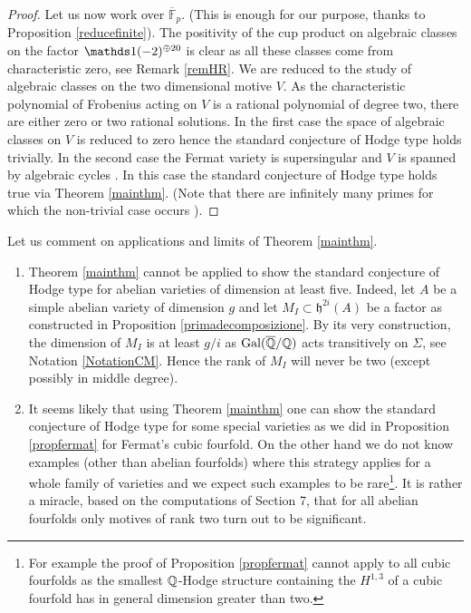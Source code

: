 \documentclass[11pt]{amsart}
\begin{document}
\begin{appendices}
\begin{proof}
Let us now work over $\overline{\mathbb{F}}_p$. (This is enough for our purpose, thanks to Proposition \ref{reducefinite}).  The positivity of the cup product on algebraic classes on the factor $\one(-2)^{\oplus 20}$ is clear as all these classes come from characteristic zero, see Remark \ref{remHR}. 
We are reduced to the study of algebraic classes on the two dimensional motive $V$.  As the characteristic polynomial of   Frobenius acting on $V$ is a rational polynomial of degree two, there are either zero or two rational solutions.  In the first case  the space of algebraic classes on $V$ is reduced to  zero hence  the standard conjecture of Hodge type holds trivially. In the second case the Fermat variety is supersingular and $V$ is spanned by algebraic cycles  \cite{ShioF}. In this case the standard conjecture of Hodge type holds true via Theorem \ref{mainthm}. (Note that there are infinitely many primes for which the non-trivial case occurs \cite[Theorem 2.10]{ShioF}). 
\end{proof}
\begin{remark}
Let us comment on applications and limits of Theorem \ref{mainthm}.
\begin{enumerate}
\item Theorem \ref{mainthm} cannot be applied to show the standard conjecture of Hodge type for abelian varieties of dimension at least five. Indeed, let $A$ be a simple abelian variety  of dimension $g$ and let $M_I\subset \mathfrak{h}^{2i}(A)$ be a factor as constructed in Proposition \ref{primadecomposizione}. By its very construction, the dimension of  $M_I$ is at least $g/i$ as $\textnormal{Gal}(\overline{\mathbb{Q}}/\mathbb{Q})$ acts transitively on $\Sigma$, see Notation \ref{NotationCM}. Hence the rank of $M_I$ will never be two (except possibly in  middle degree).
\item It seems likely that using Theorem \ref{mainthm} one can show the standard conjecture of Hodge type for some special varieties as we did in Proposition \ref{propfermat} for  Fermat's  cubic fourfold.  On the other hand we do not know examples (other than abelian fourfolds) where this strategy applies  for a whole family of varieties   and we expect such examples to be rare\footnote{For example  the proof of Proposition \ref{propfermat} cannot apply to all cubic fourfolds as the smallest $\mathbb{Q}$-Hodge structure containing the $H^{1,3}$ of a cubic fourfold has in general dimension greater than two.}.  It is rather a miracle, based on the computations of Section 7, that for all abelian fourfolds only motives of rank two turn out to be significant.\end{enumerate}
\end{remark}
\end{appendices}


%


%
\end{document}
